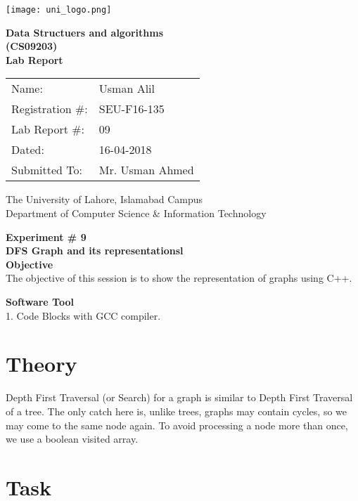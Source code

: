 \documentclass[11pt]{article}            %
\begin{document}
\begin{titlepage}
    \centering
  \vfill
    \texttt{[image: uni\_logo.png]} \\ 
	\vskip2cm
    {\bfseries\Large
	Data Structuers and algorithms \\ (CS09203)\\
	
	\vskip2cm
	Lab Report 
	 
	\vskip2cm
	}    

\begin{center}
\begin{tabular}{ l l  } 

Name: & Usman Alil \\ 
Registration \#: & SEU-F16-135 \\ 
Lab Report \#: & 09 \\ 
 Dated:& 16-04-2018\\ 
Submitted To:& Mr. Usman Ahmed\\ 

\end{tabular}
\end{center}
    \vfill
    The University of Lahore, Islamabad Campus\\
Department of Computer Science \& Information Technology
\end{titlepage}


    
    {\bfseries\Large
\centering
	Experiment \# 9 \\

DFS Graph and its representationsl \\
	
	}    
 \vskip1cm
 \textbf {Objective}\\ The objective of this session is to show the representation of graphs using C++. 
 
 \textbf {Software Tool} \\
 1. Code Blocks with GCC compiler.

\section{Theory }              

Depth First Traversal (or Search) for a graph is similar to Depth First Traversal of a tree. The only catch here is, unlike trees, graphs may contain cycles, so we may come to the same node again. To avoid processing a node more than once, we use a boolean visited array.
\section{Task}  
\end{document}

